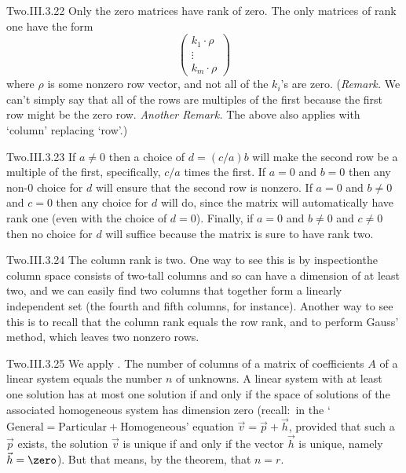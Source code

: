 \begin{ans}{Two.III.3.22}
      Only the zero matrices have rank of zero.
      The only matrices of rank one have the form
      \begin{equation*}
        \begin{pmatrix}
           k_1\cdot \rho  \\
            \vdots  \\
           k_m\cdot \rho
        \end{pmatrix}
      \end{equation*}
      where \( \rho \) is some nonzero row vector, and not all of the
      \( k_i \)'s are zero.
      (\textit{Remark.}
      We can't simply say that all of the rows are multiples of the first
      because the first row might be the zero row.
      \textit{Another Remark.}
      The above also applies with `column' replacing `row'.)
    
\end{ans}
\begin{ans}{Two.III.3.23}
      If \( a\neq 0 \) then a choice of \( d=(c/a)b \) will make the second
      row be a multiple of the first, specifically, \( c/a \) times the first.
      If \( a=0 \) and \( b=0 \) then any non-\( 0 \) choice for \( d \)
      will ensure that
      the second row is nonzero.
      If \( a=0 \) and \( b\neq 0 \) and \( c=0 \) then any choice for \( d \)
      will do, since the matrix will automatically have rank one (even with
      the choice of $d=0$).
      Finally, if \( a=0 \) and \( b\neq 0 \) and \( c\neq 0 \) then
      no choice for \( d \) will suffice because the matrix is sure to have
      rank two.
    
\end{ans}
\begin{ans}{Two.III.3.24}
      The column rank is two.
      One way to see this is by inspection\Dash the column space consists of
      two-tall columns and so can have a dimension of at least two, and we
      can easily find two columns that together form a linearly independent
      set (the fourth and fifth columns, for instance).
      Another way to see this is to recall that
      the column rank equals the row rank, and to perform Gauss' method,
      which leaves two nonzero rows.
    
\end{ans}
\begin{ans}{Two.III.3.25}
      We apply .
      The number of columns of a matrix of coefficients $A$ of a linear
      system equals the number $n$ of unknowns.
      A linear system with at least one solution has at most one solution
      if and only if the space of solutions of the associated homogeneous
      system has dimension zero (recall:~in the
      `$\text{General}=\text{Particular}+\text{Homogeneous}$' equation
       $\vec{v}=\vec{p}+\vec{h}$, provided that such a $\vec{p}$ exists,
       the solution $\vec{v}$ is unique if and only if the vector $\vec{h}$
       is unique, namely $\vec{h}=\zero$).
       But that means, by the theorem, that $n=r$.
    
\end{ans}
